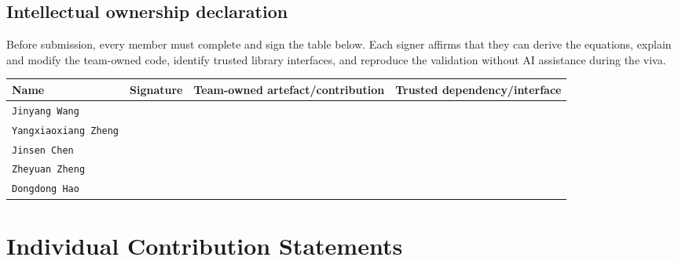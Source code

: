 \documentclass[11pt,a4paper]{article}
\theoremstyle{definition}
\theoremstyle{remark}
\begin{document}
\endgroup

\subsection{Intellectual ownership declaration}
Before submission, every member must complete and sign the table below.  Each
signer affirms that they can derive the equations, explain and modify the
team-owned code, identify trusted library interfaces, and reproduce the
validation without AI assistance during the viva.

\begin{table}[H]
\centering
\small
\begin{tabular}{p{}p{}p{}p{}}
\toprule
Name & Signature & Team-owned artefact/contribution & Trusted dependency/interface\\
\midrule
\texttt{Jinyang Wang} & & & \\
\texttt{Yangxiaoxiang Zheng} & & & \\
\texttt{Jinsen Chen} & & & \\
\texttt{Zheyuan Zheng} & & & \\
\texttt{Dongdong Hao} & & & \\
\bottomrule
\end{tabular}
\end{table}

\section{Individual Contribution Statements}
\end{document}
